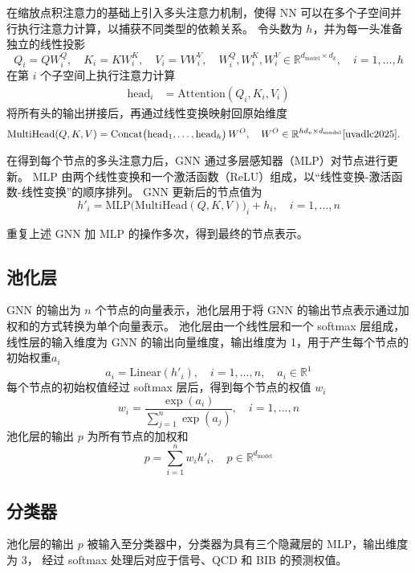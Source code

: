 在缩放点积注意力的基础上引入多头注意力机制，使得 NN 可以在多个子空间并行执行注意力计算，以捕获不同类型的依赖关系。
令头数为 $h$，并为每一头准备独立的线性投影
\[
    Q_i = QW_i^Q,\quad
    K_i = KW_i^K,\quad
    V_i = VW_i^V,\quad
    W_i^Q,W_i^K,W_i^V\in\mathbb{R}^{d_{\text{model}}\times d_k},
    \quad i=1,\dots,h
\]
在第 $i$ 个子空间上执行注意力计算
\begin{align}
    \mathrm{head}_i & = \mathrm{Attention}(Q_i, K_i, V_i)
\end{align}
将所有头的输出拼接后，再通过线性变换映射回原始维度
\begin{align}
    \mathrm{MultiHead}(Q,K,V)
     & = \mathrm{Concat}\bigl(\mathrm{head}_1,\dots,\mathrm{head}_h\bigr)\,W^O,
    \quad W^O\in\mathbb{R}^{hd_v\times d_{\text{model}}}
    \cite{uvadlc2025}.
\end{align}

在得到每个节点的多头注意力后，GNN 通过多层感知器（MLP）对节点进行更新。
MLP 由两个线性变换和一个激活函数（ReLU）组成，以“线性变换-激活函数-线性变换”的顺序排列。
GNN 更新后的节点值为
\begin{equation}
    h'_i = \mathrm{MLP}\bigl(\mathrm{MultiHead}(Q,K,V)\bigr)_i + h_i,
    \quad i=1,\dots,n
\end{equation}

重复上述 GNN 加 MLP 的操作多次，得到最终的节点表示。


\subsection{池化层}
GNN 的输出为 $n$ 个节点的向量表示，池化层用于将 GNN 的输出节点表示通过加权和的方式转换为单个向量表示。
池化层由一个线性层和一个 softmax 层组成，
线性层的输入维度为 GNN 的输出向量维度，输出维度为 1，用于产生每个节点的初始权重$a_i$
\begin{equation}
    a_i = \mathrm{Linear}(h'_i), \quad i=1,\dots,n,
    \quad a_i\in\mathbb{R}^1
\end{equation}
每个节点的初始权值经过 softmax 层后，得到每个节点的权值 $w_i$
\begin{equation}
    w_i = \frac{\exp(a_i)}{\sum_{j=1}^n \exp(a_j)}, \quad i=1,\dots,n
\end{equation}
池化层的输出 $p$ 为所有节点的加权和
\begin{equation}
    p = \sum_{i=1}^n w_i h'_i,
    \quad p\in\mathbb{R}^{d_{\text{model}}}
\end{equation}


\subsection{分类器}
池化层的输出 $p$ 被输入至分类器中，分类器为具有三个隐藏层的 MLP，输出维度为 3，
经过 softmax 处理后对应于信号、QCD 和 BIB 的预测权值。



